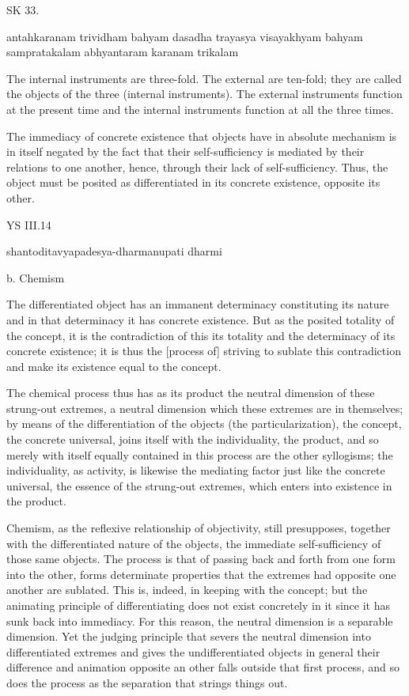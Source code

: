 SK 33.

antahkaranam trividham bahyam dasadha trayasya visayakhyam
bahyam sampratakalam abhyantaram karanam trikalam

The internal instruments are three-fold.
The external are ten-fold; they are called the objects of the three (internal instruments).
The external instruments function at the present time and
the internal instruments function at all the three times.

The immediacy of concrete existence that objects have in absolute mechanism
is in itself negated by the fact that their self-sufficiency is mediated by
their relations to one another, hence, through their lack of self-sufficiency.
Thus, the object must be posited as differentiated in its concrete existence,
opposite its other.

YS III.14

shantoditavyapadesya-dharmanupati dharmi

b. Chemism

The differentiated object has an immanent determinacy constituting
its nature and in that determinacy it has concrete existence.
But as the posited totality of the concept, it is the contradiction of
this its totality and the determinacy of its concrete existence;
it is thus the [process of] striving to sublate this contradiction
and make its existence equal to the concept.

The chemical process thus has as its product the neutral dimension of
these strung-out extremes, a neutral dimension which these extremes are
in themselves; by means of the differentiation of the objects (the particularization),
the concept, the concrete universal, joins itself
with the individuality, the product, and so merely
with itself equally contained in this process are the other syllogisms;
the individuality, as activity, is likewise the mediating factor just like the concrete universal,
the essence of the strung-out extremes, which enters into existence in the product.

Chemism, as the reflexive relationship of objectivity, still presupposes,
together with the differentiated nature of the objects,
the immediate self-sufficiency of those same objects.
The process is that of passing back and forth from one form into the other,
forms determinate properties that the extremes had opposite one another are sublated.
This is, indeed, in keeping with the concept;
but the animating principle of differentiating does not exist
concretely in it since it has sunk back into immediacy.
For this reason, the neutral dimension is a separable dimension.
Yet the judging principle that severs the neutral dimension into
differentiated extremes and gives the undifferentiated objects in general
their difference and animation opposite an other falls outside that first process,
and so does the process as the separation that strings things out.

